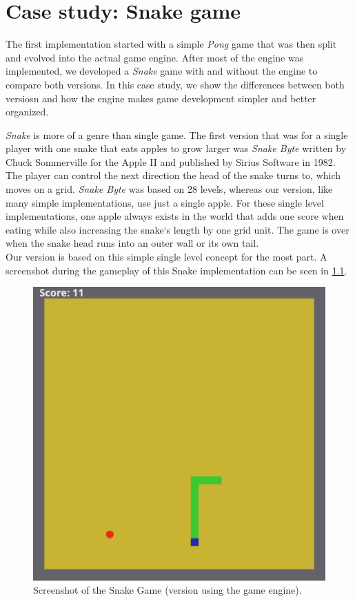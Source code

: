 \chapter{Case study: Snake game}\label{chap:casestudy}

The first implementation started with a simple \textit{Pong} game that was then split and evolved into the actual game engine. After most of the engine was implemented, we developed a \textit{Snake} game with and without the engine to compare both versions. In this case study, we show the differences between both versiosn and how the engine makes game development simpler and better organized.

\textit{Snake} is more of a genre than single game. The first version that was for a single player with one snake that eats apples to grow larger was \textit{Snake Byte} written by Chuck Sommerville for the Apple II and published by Sirius Software in 1982. The player can control the next direction the head of the snake turns to, which moves on a grid. \textit{Snake Byte} was based on 28 levels, whereas our version, like many simple implementations, use just a single apple. For these single level implementations, one apple always exists in the world that adds one score when eating while also increasing the snake`s length by one grid unit. The game is over when the snake head runs into an outer wall or its own tail.\\
Our version is based on this simple single level concept for the most part. A screenshot during the gameplay of this Snake implementation can be seen in \cref{fig:snake}.

\begin{figure}
\centering
\includegraphics[width=\linewidth]{img/snake_screenshot.png}
\caption{Screenshot of the Snake Game (version using the game engine).}
\label{fig:snake}
\end{figure}

